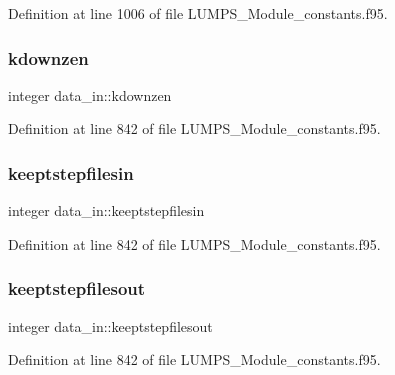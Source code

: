 Definition at line 1006 of file L\+U\+M\+P\+S\+\_\+\+Module\+\_\+constants.\+f95.

\mbox{\label{namespacedata__in_ad7a96eb31a956b650073fc7135d307cd}} 
\subsubsection{\texorpdfstring{kdownzen}{kdownzen}}
{\footnotesize\ttfamily integer data\+\_\+in\+::kdownzen}



Definition at line 842 of file L\+U\+M\+P\+S\+\_\+\+Module\+\_\+constants.\+f95.

\mbox{\label{namespacedata__in_a66e75b7142f8d93aecf0a9c94a8a25d9}} 
\subsubsection{\texorpdfstring{keeptstepfilesin}{keeptstepfilesin}}
{\footnotesize\ttfamily integer data\+\_\+in\+::keeptstepfilesin}



Definition at line 842 of file L\+U\+M\+P\+S\+\_\+\+Module\+\_\+constants.\+f95.

\mbox{\label{namespacedata__in_ab9a0f114993684cd73bedea082abe184}} 
\subsubsection{\texorpdfstring{keeptstepfilesout}{keeptstepfilesout}}
{\footnotesize\ttfamily integer data\+\_\+in\+::keeptstepfilesout}



Definition at line 842 of file L\+U\+M\+P\+S\+\_\+\+Module\+\_\+constants.\+f95.

\mbox{\label{namespacedata__in_a5d9f4f79563d2e000333219a4d2f4c99}} 

